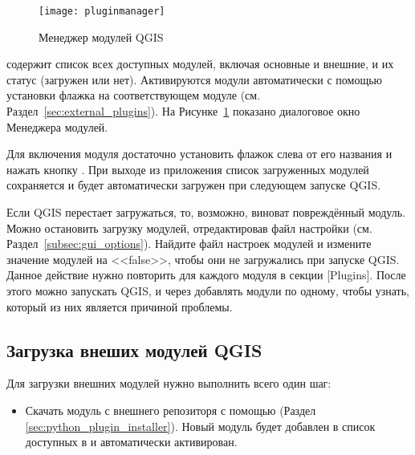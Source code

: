 \begin{figure}[ht]
   \centering
   \texttt{[image: pluginmanager]}
   \caption{Менеджер модулей QGIS \wincaption}\label{fig:pluginmanager}\smallskip
\end{figure}

 содержит список всех доступных модулей,
включая основные и внешние, и их статус (загружен или нет).
Активируются модули автоматически с помощью установки флажка на соответствующем
модуле (см. Раздел~\ref{sec:external_plugins}).
На Рисунке~\ref{fig:pluginmanager} показано диалоговое окно Менеджера
модулей.

Для включения модуля достаточно установить флажок слева от его названия
и нажать кнопку . При выходе из приложения список
загруженных модулей сохраняется и будет автоматически загружен при
следующем запуске QGIS.

\begin{Tip}\caption{\textsc{Повреждённые модули}}
Если QGIS перестает загружаться, то, возможно, виноват повреждённый
модуль. Можно остановить загрузку модулей, отредактировав файл настройки
(см. Раздел~\ref{subsec:gui_options}). Найдите файл настроек модулей и
измените значение модулей на <<false>>, чтобы они не загружались при
запуске QGIS.
\normalfont
Данное действие нужно повторить для каждого модуля в секции [Plugins].
После этого можно запускать QGIS, и через 
добавлять модули по одному, чтобы узнать, который из них является
причиной проблемы.
\end{Tip}

\subsection{Загрузка внеших модулей QGIS}\label{sec:load_external_plugin}

Для загрузки внешних модулей нужно выполнить всего один шаг:

\begin{itemize}[label=--]
\item Скачать модуль с внешнего репозиторя с помощью
 (Раздел \ref{sec:python_plugin_installer}).
Новый модуль будет добавлен в список доступных в
 и автоматически активирован.
\end{itemize}

